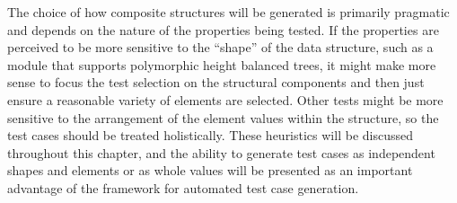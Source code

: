 The choice of how composite structures will be generated is primarily pragmatic
and depends on the nature of the properties being tested.
If the properties are perceived to be more sensitive to
the ``shape'' of the data structure,
such as a module that supports polymorphic height balanced trees, 
it might make more sense to focus the test selection on the structural components
and then just ensure a reasonable variety of elements are selected.
Other tests might be more sensitive to the arrangement of 
the element values within the structure,
so the test cases should be treated holistically.
These heuristics will be discussed throughout this chapter,
and the ability to generate test cases as independent shapes and elements
or as whole values will be presented as an important advantage of
the \GC framework for automated test case generation.


